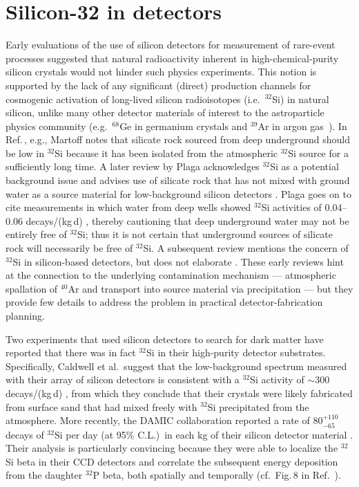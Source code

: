 \documentclass[final,5p]{elsarticle}
\def\si{$^{32}$Si\xspace}
\def\p{$^{32}$P\xspace}
\begin{document}
\section{Silicon-32 in detectors}\label{sec:detectors}
Early evaluations of the use of silicon detectors for measurement of rare-event processes  suggested that natural radioactivity inherent in high-chemical-purity silicon crystals would not hinder such physics experiments.  This notion is supported by the lack of any significant (direct) production channels for cosmogenic activation of long-lived silicon radioisotopes (i.e.\ \si) in natural silicon, unlike many other detector materials of interest to the astroparticle physics community (e.g.\ $^{68}$Ge in germanium crystals and $^{39}$Ar in argon gas~\cite{cebrian}). In Ref.\,\cite{martoff}, e.g.,  Martoff notes that silicate rock sourced from deep underground should be low in \si because it has been isolated from the atmospheric \si source for a sufficiently long time. A later review by Plaga acknowledges \si as a potential background issue and advises  use of silicate rock that has not mixed with ground water as a source material for low-background silicon detectors \cite{plaga}. Plaga goes on to cite measurements in which water from deep wells showed \si activities of 0.04--0.06 decays/(kg\,d) \cite{ground_water}, thereby cautioning that deep underground water may not be entirely free of \si; thus it is not certain that underground sources of silicate rock will necessarily be free of \si. A subsequent review mentions the concern of \si in silicon-based detectors, but does not elaborate \cite{heusser}. These early reviews hint at the connection to the underlying contamination mechanism --- atmospheric spallation of $^{40}$Ar and transport into source material via precipitation --- but they provide few details to address the problem in practical detector-fabrication planning.

Two experiments that used silicon detectors to search for dark matter have reported that there was in fact \si in their high-purity detector substrates. Specifically, Caldwell et al.\ suggest that the low-background spectrum measured with their array of silicon detectors is consistent with a \si activity of $\sim$300 decays/(kg\,d) \cite{cosmion}, from which they conclude that their crystals were likely fabricated from surface sand that had mixed freely with \si precipitated from the atmosphere. More recently, the DAMIC collaboration reported a rate of 80$^{+110}_{-65}$ decays of \si per day (at 95\% C.L.)\ in each kg of their silicon detector material \cite{damic_backgrounds}. Their analysis is particularly convincing because they were able to localize the \si beta in their CCD detectors and correlate the subsequent energy deposition from the daughter \p beta, both spatially and temporally (cf.~Fig.\,8 in Ref.\ \cite{damic_backgrounds}).  
\end{document}
